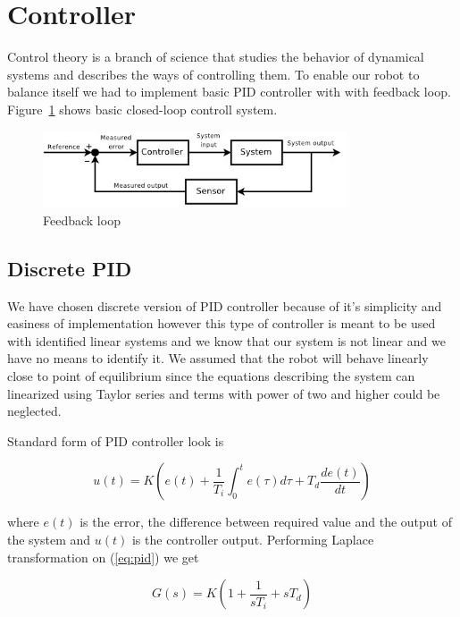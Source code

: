 \documentclass{article}
\begin{document}
\section{Controller}

Control theory is a branch of science that studies the behavior of dynamical
systems and describes the ways of controlling them. To enable our robot to
balance itself we had to implement basic PID controller with with feedback loop.
Figure~\ref{fig:loop} shows basic closed-loop controll system.

\begin{figure}[h]
    \centering
    \includegraphics[width=9cm]{loop}
    \caption{Feedback loop \cite{wloop}}
    \label{fig:loop}
\end{figure}

\subsection{Discrete PID}

We have chosen discrete version of PID controller because of it's simplicity and
easiness of implementation however this type of controller is meant to be used
with identified linear systems and we know that our system is not linear and we
have no means to identify it. We assumed that the robot will behave linearly
close to point of equilibrium since the equations describing the system can
linearized using Taylor series and terms with power of two and higher could be
neglected.

Standard form of PID controller look is

\begin{equation} \label{eq:pid}
    u(t) = K \left( e(t) + \frac{1}{T_i} \int_0^t e(\tau)d\tau + T_d
        \frac{de(t)}{dt} \right)
\end{equation}

\noindent where $e(t)$ is the error, the difference between required value and
the output of the system and $u(t)$ is the controller output. Performing Laplace
transformation \cite{lt} on (\ref{eq:pid}) we get

\begin{equation}
    G(s) = K \left( 1 + \frac{1}{sT_i} + sT_d \right)
\end{equation}
\end{document}
